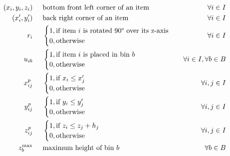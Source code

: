 \begin{align}
              (x_i,y_i,z_i) \hspace{.5cm}& \text{bottom front left corner of an item} & \forall i \in I \label{var:item_pos} \\
    (x^\prime_i,y^\prime_i) \hspace{.5cm}& \text{back right corner of an item} & \forall i \in I \label{var:item_back_pos} \\
                        r_i \hspace{.5cm}& \begin{cases}
                                            1, \text{if item $i$ is rotated 90° over its z-axis} \\ 
                                            0, \text{otherwise}
                                        \end{cases} & \forall i \in I \label{var:item_rot} \\
                    u_{ib} \hspace{.5cm}& \begin{cases}
                                            1, \text{if item $i$ is placed in bin $b$} \\ 
                                            0, \text{otherwise}
                                        \end{cases} & \forall i \in I, \forall b \in B \notag \\
                    x^p_{ij} \hspace{.5cm}& \begin{cases}
                                            1, \text{if $x_i \le x^\prime_j$} \\ 
                                            0, \text{otherwise}
                                        \end{cases} & \forall i,j \in I \notag \\
                    y^p_{ij} \hspace{.5cm}& \begin{cases}
                                            1, \text{if $y_i \le y^\prime_j$} \\ 
                                            0, \text{otherwise}
                                        \end{cases} & \forall i,j \in I \notag \\
                    z^p_{ij} \hspace{.5cm}& \begin{cases}
                                            1, \text{if $z_i \le z_j + h_j$} \\ 
                                            0, \text{otherwise}
                                        \end{cases} & \forall i,j \in I \notag \\
            z_b^\text{max} \hspace{.5cm}& \text{maximum height of bin $b$} & \forall b \in B \notag
\end{align}

